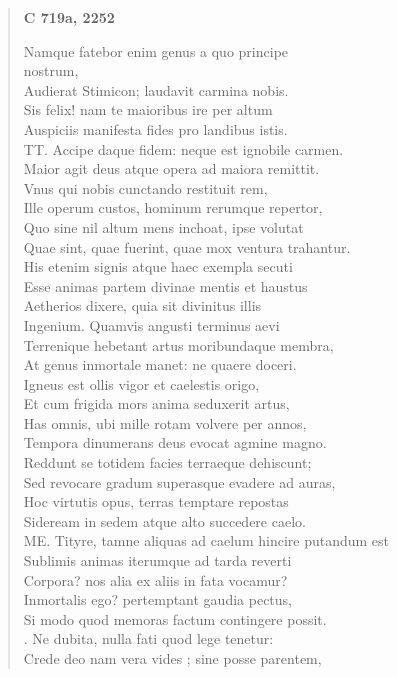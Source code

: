 \documentclass[11pt, a4paper]{report}
\begin{document}
\begin{verse}
    \begin{center} \textbf{C 719a, 2252} \end{center} \marginpar{[190]} Namque fatebor enim genus a quo principe \\ nostrum, \\ Audierat Stimicon; laudavit carmina nobis. \\ Sis felix! nam te maioribus ire per altum \\ Auspiciis manifesta fides pro landibus istis. \\ TT. Accipe daque fidem: neque est ignobile carmen. \\ Maior agit deus atque opera ad maiora remittit. \\ Vnus qui nobis cunctando restituit rem, \\ Ille operum custos, hominum rerumque repertor, \\ Quo sine nil altum mens inchoat, ipse volutat \\ Quae sint, quae fuerint, quae mox ventura trahantur. \\ His etenim signis atque haec exempla secuti \\ Esse animas partem divinae mentis et haustus \\ Aetherios dixere, quia sit divinitus illis \\ Ingenium. Quamvis angusti terminus aevi \\ Terrenique hebetant artus moribundaque membra, \\ At genus inmortale manet: ne quaere doceri. \\ Igneus est ollis vigor et caelestis origo, \\ Et cum frigida mors anima seduxerit artus, \\ Has omnis, ubi mille rotam volvere per annos, \\ Tempora dinumerans deus evocat agmine magno. \\ Reddunt se totidem facies terraeque dehiscunt; \\ Sed revocare gradum superasque evadere ad auras, \\ Hoc virtutis opus, terras temptare repostas \\ Sideream in sedem atque alto succedere caelo. \\ ME. Tityre, tamne aliquas ad caelum hincire putandum est \\ Sublimis animas iterumque ad tarda reverti \\ Corpora? nos alia ex aliis in fata vocamur? \\ Inmortalis ego? pertemptant gaudia pectus, \\ Si modo quod memoras factum contingere possit. \\ . Ne dubita, nulla fati quod lege tenetur: \\ Crede deo nam vera vides ; sine posse parentem, \\ 

\end{verse}
\end{document}
